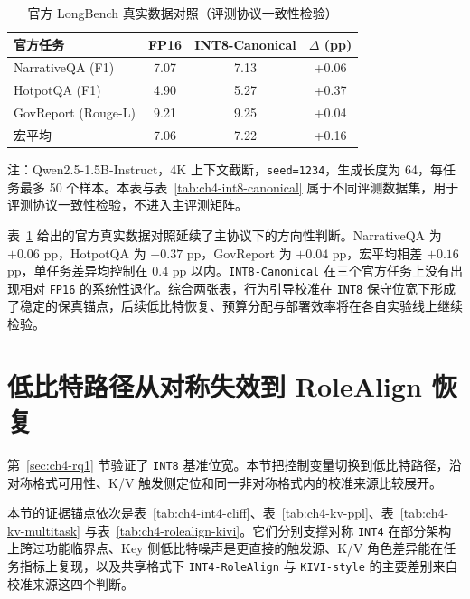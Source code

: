 \begin{table}[H]
  \centering
  \caption{官方 LongBench 真实数据对照（评测协议一致性检验）}
  \label{tab:ch4-longbench-official}
  {%
  \footnotesize
  \setlength{\tabcolsep}{4pt}
  \renewcommand{\arraystretch}{1.05}
  \begin{tabular}{lccc}
    \toprule
    官方任务 & FP16 & INT8-Canonical & $\Delta$ (pp) \\
    \midrule
    NarrativeQA (F1)        & 7.07 & 7.13 & +0.06 \\
    HotpotQA (F1)           & 4.90 & 5.27 & +0.37 \\
    GovReport (Rouge-L)     & 9.21 & 9.25 & +0.04 \\
    宏平均                  & 7.06 & 7.22 & +0.16 \\
    \bottomrule
  \end{tabular}

  \vspace{0.35em}
  \begin{minipage}{0.94\linewidth}
    \footnotesize
    注：Qwen2.5-1.5B-Instruct，4K 上下文截断，\texttt{seed=1234}，生成长度为 64，每任务最多 50 个样本。本表与表~\ref{tab:ch4-int8-canonical} 属于不同评测数据集，用于评测协议一致性检验，不进入主评测矩阵。
  \end{minipage}
  }
\end{table}

表~\ref{tab:ch4-longbench-official} 给出的官方真实数据对照延续了主协议下的方向性判断。NarrativeQA 为 $+0.06$ pp，HotpotQA 为 $+0.37$ pp，GovReport 为 $+0.04$ pp，宏平均相差 $+0.16$ pp，单任务差异均控制在 $0.4$ pp 以内。\texttt{INT8-Canonical} 在三个官方任务上没有出现相对 \texttt{FP16} 的系统性退化。综合两张表，行为引导校准在 \texttt{INT8} 保守位宽下形成了稳定的保真锚点，后续低比特恢复、预算分配与部署效率将在各自实验线上继续检验。

\section{低比特路径从对称失效到 RoleAlign 恢复}
\label{sec:ch4-rq2}
\label{sec:exp-int4-kivi}
\label{sec:exp-main}

第~\ref{sec:ch4-rq1} 节验证了 \texttt{INT8} 基准位宽。本节把控制变量切换到低比特路径，沿对称格式可用性、K/V 触发侧定位和同一非对称格式内的校准来源比较展开。

本节的证据锚点依次是表~\ref{tab:ch4-int4-cliff}、表~\ref{tab:ch4-kv-ppl}、表~\ref{tab:ch4-kv-multitask} 与表~\ref{tab:ch4-rolealign-kivi}。它们分别支撑对称 \texttt{INT4} 在部分架构上跨过功能临界点、Key 侧低比特噪声是更直接的触发源、K/V 角色差异能在任务指标上复现，以及共享格式下 \texttt{INT4-RoleAlign} 与 \texttt{KIVI-style} 的主要差别来自校准来源这四个判断。

